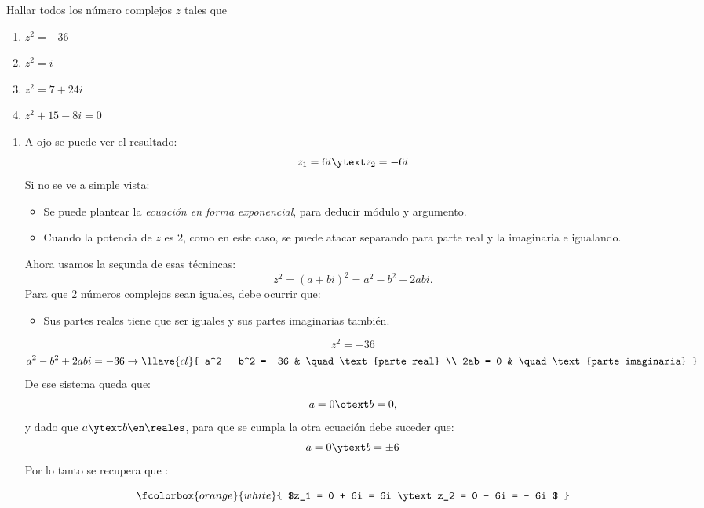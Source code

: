 \begin{enunciado}{\ejercicio}
  Hallar todos los número complejos $z$ tales que
  \begin{multicols}{4}
    \begin{enumerate}[label=\roman*)]
      \item $z^2 = -36$
      \item $z^2 = i$
      \item $z^2 = 7+24i$
      \item $z^2 + 15 -8i = 0$
    \end{enumerate}
  \end{multicols}
\end{enunciado}

\begin{enumerate}[label=\roman*)]
  \item\label{ej-3-item-i} A ojo se puede ver el resultado:
        $$
          z_1 = 6i \ytext z_2 = -6i
        $$
        Si no se ve a simple vista:
        \begin{itemize}
          \item Se puede plantear la \textit{ecuación en forma exponencial}, para deducir módulo y argumento.
          \item Cuando la potencia de $z$ es 2, como en este caso, se puede atacar separando para parte real y la imaginaria e igualando.
        \end{itemize}
        Ahora usamos la segunda de esas técnincas:
        $$
          z^2 = (a+bi)^2 = a^2-b^2 + 2abi.
        $$
        Para que 2 números complejos sean iguales, debe ocurrir que:
        \begin{itemize}[label=\tiny{}]
          \item Sus partes reales tiene que ser iguales y sus partes imaginarias también.
        \end{itemize}
        $$
          z^2 = -36
        $$
        $$
          a^2-b^2 + 2abi = - 36
          \to
          \llave{cl}{
            a^2 - b^2 = -36 & \quad \text{parte real}       \\
            2ab = 0         & \quad \text{parte imaginaria}
          }
        $$
        De ese sistema queda que:
        $$
          a = 0 \otext b = 0,
        $$
        y dado que $a\ytext b \en \reales$, para que se cumpla la otra ecuación debe suceder que:
        $$
          a = 0 \ytext b = \pm6
        $$
        Por lo tanto se recupera que :

        $$
          \fcolorbox{orange}{white}{
            $z_1 = 0 + 6i = 6i
              \ytext
              z_2 = 0 - 6i = - 6i
            $
          }
        $$


\end{enumerate}
